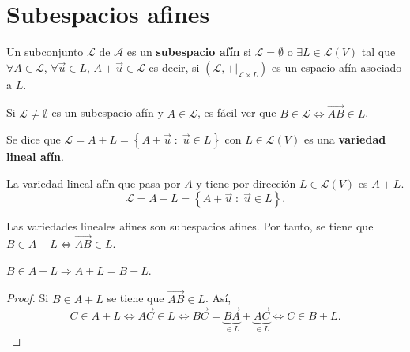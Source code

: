 \section{Subespacios afines}
\begin{fdefinition}
\normalfont Un subconjunto $\displaystyle \mathcal{L}  $ de $\displaystyle \mathcal{A} $ es un \textbf{subespacio afín} si $\displaystyle \mathcal{L} = \emptyset $ o $\displaystyle \exists L \in \mathcal{L}\left(V\right) $ tal que $\displaystyle \forall A \in \mathcal{L} $, $\displaystyle \forall \vec{u} \in L $, $\displaystyle A + \vec{u} \in \mathcal{L} $ es decir, si $\displaystyle \left(\mathcal{L}, +|_{\mathcal{L}\times L}\right) $ es un espacio afín asociado a $\displaystyle L $.
\end{fdefinition}
\begin{observation}
\normalfont Si $\displaystyle \mathcal{L} \neq \emptyset $ es un subespacio afín y $\displaystyle A \in \mathcal{L} $, es fácil ver que $\displaystyle B \in \mathcal{L} \iff\overrightarrow{AB} \in L$. 
\end{observation}
\begin{fdefinition}
	\normalfont Se dice que $\displaystyle \mathcal{L} = A + L = \left\{ A + \vec{u} \; : \; \vec{u} \in L\right\}$ con $\displaystyle L \in \mathcal{L}\left(V\right) $ es una \textbf{variedad lineal afín}.
\end{fdefinition}
\begin{observation}
\normalfont La variedad lineal afín que pasa por $\displaystyle A $ y tiene por dirección $\displaystyle L \in \mathcal{L}\left(V\right) $ es $\displaystyle A + L $.
\[ \mathcal{L} = A + L = \left\{ A +\vec{u} \; : \; \vec{u} \in L\right\} .\]
\end{observation}
\begin{observation}
	\normalfont Las variedades lineales afines son subespacios afines. Por tanto, se tiene que $\displaystyle B \in A + L \iff \overrightarrow{AB} \in L$.
\end{observation}
\begin{fprop}[]
\normalfont $\displaystyle B \in A + L \Rightarrow A + L = B + L $.
\end{fprop}
\begin{proof}
	Si $\displaystyle B \in A + L $ se tiene que $\displaystyle \overrightarrow{AB} \in L $. Así,
	\[ C \in A + L \iff \overrightarrow{AC} \in L \iff \overrightarrow{BC} = \underbrace{\overrightarrow{BA}}_{\in L} + \underbrace{\overrightarrow{AC}}_{\in L} \iff C \in B + L .\]
\end{proof}

